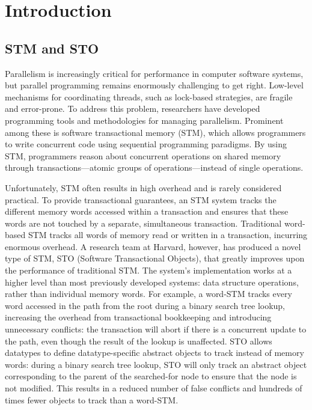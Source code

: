\chapter{Introduction}
\section{STM and STO}
Parallelism is increasingly critical for performance in computer software systems, but parallel programming remains enormously challenging to get right. Low-level mechanisms for coordinating threads, such as lock-based strategies, are fragile and error-prone. To address this problem, researchers have developed programming tools and methodologies for managing parallelism. Prominent among these is software transactional memory (STM), which allows programmers to write concurrent code using sequential programming paradigms. By using STM, programmers reason about concurrent operations on shared memory through transactions---atomic groups of operations---instead of single operations. 

Unfortunately, STM often results in high overhead and is rarely considered practical. To provide transactional guarantees, an STM system tracks the different memory words accessed within a transaction and ensures that these words are not touched by a separate, simultaneous transaction. Traditional word-based STM tracks all words of memory read or written in a transaction, incurring enormous overhead\cite{cascaval}. A research team at Harvard, however, has produced a novel type of STM, STO (Software Transactional Objects), that greatly improves upon the performance of traditional STM\cite{sto}. The system's implementation works at a higher level than most previously developed systems: data structure operations, rather than individual memory words. For example, a word-STM tracks every word accessed in the path from the root during a binary search tree lookup, increasing the overhead from transactional bookkeeping and introducing unnecessary conflicts: the transaction will abort if there is a concurrent update to the path, even though the result of the lookup is unaffected. STO allows datatypes to define datatype-specific abstract objects to track instead of memory words: during a binary search tree lookup, STO will only track an abstract object corresponding to the parent of the searched-for node to ensure that the node is not modified. This results in a reduced number of false conflicts and hundreds of times fewer objects to track than a word-STM. 

